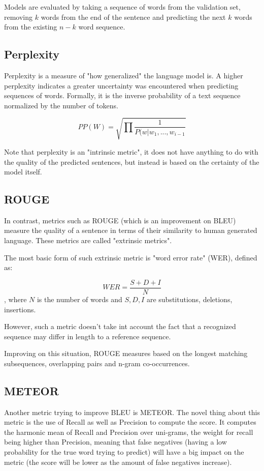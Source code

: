 \documentclass[a4paper]{article}
\begin{document}
Models are evaluated by taking a sequence
of words from the validation set, removing
$k$ words from the end of the sentence and predicting
the next $k$ words from the existing $n - k$ word sequence.

\subsection{Perplexity}
\label{sec:perplexity}

Perplexity is a measure of "how generalized" the language
model is. A higher perplexity indicates a greater uncertainty
was encountered when predicting sequences of words. Formally,
it is the inverse probability of a text sequence normalized
by the number of tokens.

$$ PP(W) = \sqrt{\prod \frac{1}{P(w|w_1, ..., w_{i - 1}}} $$

Note that perplexity is an "intrinsic metric", it does not
have anything to do with the quality of the predicted
sentences, but instead is based on the certainty of the
model itself.

\subsection{ROUGE}
\label{sec:rouge}

In contrast, metrics such as ROUGE (which is an improvement
on BLEU) measure the quality of a sentence in terms of
their similarity to human generated language. These metrics
are called "extrinsic metrics".

The most basic form of such extrinsic metric is "word error
rate" (WER), defined as:

$$ WER = \frac{S + D + I}{N} $$, where $N$ is the number of
words and $S, D, I$ are substitutions, deletions, insertions.

However, such a metric doesn't take int account the fact that
a recognized sequence may differ in length to a reference
sequence.

Improving on this situation, ROUGE measures based on the
longest matching subsequences, overlapping pairs and n-gram
co-occurrences.

\subsection{METEOR}
\label{sec:meteor}
Another metric trying to improve BLEU is METEOR. The novel thing about this metric is the use of Recall as well as Precision to compute the score. It computes the harmonic mean of Recall and Precision over uni-grams, the weight for recall being higher than Precision, meaning that false negatives (having a low probability for the true word trying to predict) will have a big impact on the metric (the score will be lower as the amount of false negatives increase).
\end{document}
